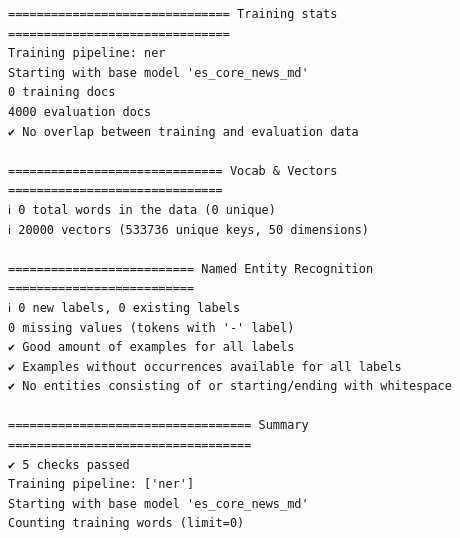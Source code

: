 \documentclass[12pt,a4paper,]{scrartcl}
\begin{document}
\begin{verbatim}
=============================== Training stats ===============================
Training pipeline: ner
Starting with base model 'es_core_news_md'
0 training docs
4000 evaluation docs
✔ No overlap between training and evaluation data

============================== Vocab & Vectors ==============================
ℹ 0 total words in the data (0 unique)
ℹ 20000 vectors (533736 unique keys, 50 dimensions)

========================== Named Entity Recognition ==========================
ℹ 0 new labels, 0 existing labels
0 missing values (tokens with '-' label)
✔ Good amount of examples for all labels
✔ Examples without occurrences available for all labels
✔ No entities consisting of or starting/ending with whitespace

================================== Summary ==================================
✔ 5 checks passed
Training pipeline: ['ner']
Starting with base model 'es_core_news_md'
Counting training words (limit=0)
\end{verbatim}
\end{document}

